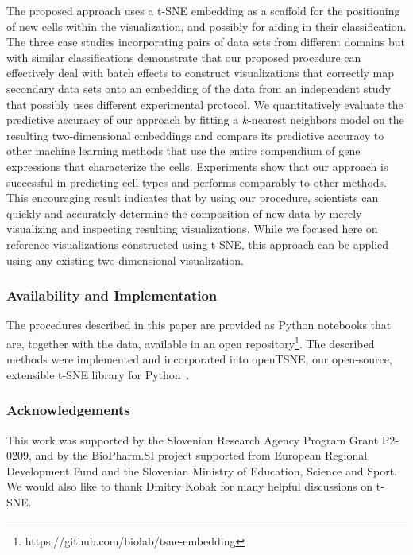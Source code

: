 \documentclass[runningheads]{llncs}
\begin{document}
The proposed approach uses a t-SNE embedding as a scaffold for the positioning
of new cells within the visualization, and possibly for aiding in their
classification. The three case studies incorporating pairs of data sets from
different domains but with similar classifications demonstrate that our proposed
procedure can effectively deal with batch effects to construct visualizations
that correctly map secondary data sets onto an embedding of the data from an
independent study that possibly uses different experimental protocol. We
quantitatively evaluate the predictive accuracy of our approach by fitting a
$k$-nearest neighbors model on the resulting two-dimensional embeddings and
compare its predictive accuracy to other machine learning methods that use the
entire compendium of gene expressions that characterize the cells. Experiments
show that our approach is successful in predicting cell types and performs
comparably to other methods. This encouraging result indicates that by using our
procedure, scientists can quickly and accurately determine the composition of
new data by merely visualizing and inspecting resulting visualizations. While we
focused here on reference visualizations constructed using t-SNE, this approach
can be applied using any existing two-dimensional visualization.

\subsubsection*{Availability and Implementation\label{sec:implementation}}

The procedures described in this paper are provided as Python notebooks that
are, together with the data, available in an open
repository\footnote{https://github.com/biolab/tsne-embedding}. The described
methods were implemented and incorporated into \textsf{openTSNE}, our
open-source, extensible t-SNE library for Python~\cite{Policar2019}.


\subsubsection*{Acknowledgements}

This work was supported by the Slovenian Research Agen\-cy Program Grant P2-0209,
and by the BioPharm.SI project supported from European Regional Development
Fund and the Slovenian Ministry of Education, Science and Sport. We would also
like to thank Dmitry Kobak for many helpful discussions on t-SNE.

% 


\end{document}
